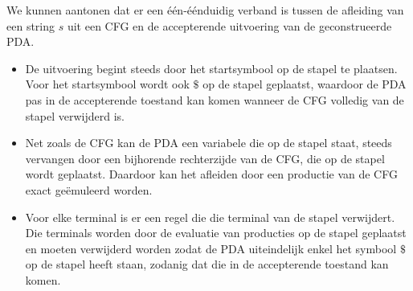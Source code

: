   We kunnen aantonen dat er een \'e\'en-\'e\'enduidig verband is tussen de afleiding van een string $s$ uit een CFG en de accepterende uitvoering van de geconstrueerde PDA.
  \begin{itemize}
  \item De uitvoering begint steeds door het startsymbool op de stapel te plaatsen. Voor het startsymbool wordt ook $\$$ op de stapel geplaatst, waardoor de PDA pas in de accepterende toestand kan komen wanneer de CFG volledig van de stapel verwijderd is.
  \item Net zoals de CFG kan de PDA een variabele die op de stapel staat, steeds vervangen door een bijhorende rechterzijde van de CFG, die op de stapel wordt geplaatst. Daardoor kan het afleiden door een productie van de CFG exact ge\"emuleerd worden.
  \item Voor elke terminal is er een regel die die terminal van de stapel verwijdert. Die terminals worden door de evaluatie van producties op de stapel geplaatst en moeten verwijderd worden zodat de PDA uiteindelijk enkel het symbool $\$$ op de stapel heeft staan, zodanig dat die in de accepterende toestand kan komen.
  \end{itemize}